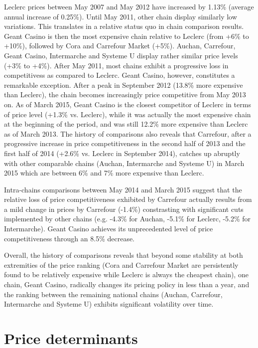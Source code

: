 \documentclass[english]{article}
\begin{document}
Leclerc prices between May 2007 and May 2012 have increased by 1.13\% (average annual increase of 0.25\%). Until May 2011, other chain display similarly low variations. This translates in a relative status quo in chain comparison results. Geant Casino is then the most expensive chain relative to Leclerc (from +6\% to +10\%), followed by Cora and Carrefour Market (+5\%). Auchan, Carrefour, Geant Casino, Intermarche and Systeme U display rather similar price levels (+3\% to +4\%). After May 2011, most chains exhibit a progressive loss in competitivess as compared to Leclerc. Geant Casino, however, constitutes a remarkable exception. After a peak in September 2012 (13.8\% more expensive than Leclerc), the chain becomes increasingly price competitive from May 2013 on. As of March 2015, Geant Casino is the closest competitor of Leclerc in terms of price level (+1.3\% vs. Leclerc), while it was actually the most expensive chain at the beginning of the period, and was still 12.2\% more expensive than Leclerc as of March 2013. The history of comparisons also reveals that Carrefour, after a progressive increase in price competitiveness in the second half of 2013 and the first half of 2014 (+2.6\% vs. Leclerc in September 2014), catches up abruptly with other comparable chains (Auchan, Intermarche and Systeme U) in March 2015 which are between 6\% and 7\% more expensive than Leclerc.

Intra-chains comparisons between May 2014 and March 2015 suggest that the relative loss of price competitiveness exhibited by Carrefour actually results from a mild change in prices by Carrefour (-1.4\%) constrasting with significant cuts implemented by other chains (e.g. -4.3\% for Auchan, -5.1\% for Leclerc, -5.2\% for Intermarche). Geant Casino achieves its unprecedented level of price competitiveness through an 8.5\% decrease.

Overall, the history of comparisons reveals that beyond some stability at both extremities of the price ranking (Cora and Carrefour Market are persistently found to be relatively expensive while Leclerc is always the cheapest chain), one chain, Geant Casino, radically changes its pricing policy in less than a year, and the ranking between the remaining national chains (Auchan, Carrefour, Intermarche and Systeme U) exhibits significant volatility over time.

\section{Price determinants}
\end{document}
